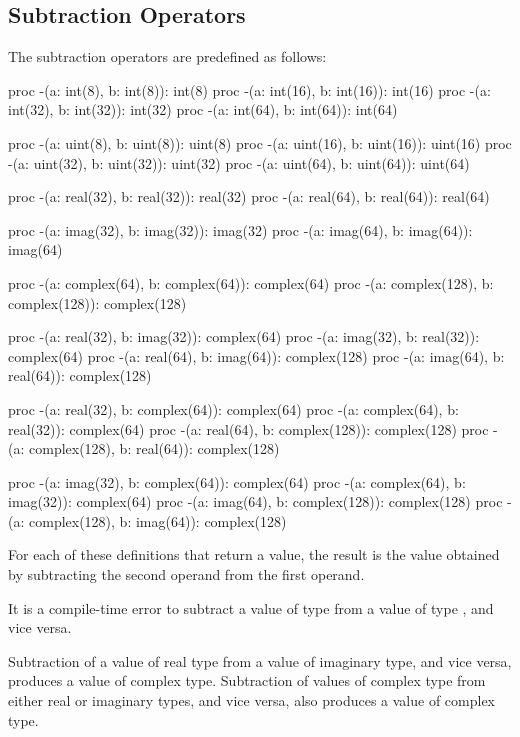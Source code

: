 \subsection{Subtraction Operators}
\label{Subtraction_Operators}

The subtraction operators are predefined as follows:
\begin{chapel}
proc -(a: int(8), b: int(8)): int(8)
proc -(a: int(16), b: int(16)): int(16)
proc -(a: int(32), b: int(32)): int(32)
proc -(a: int(64), b: int(64)): int(64)

proc -(a: uint(8), b: uint(8)): uint(8)
proc -(a: uint(16), b: uint(16)): uint(16)
proc -(a: uint(32), b: uint(32)): uint(32)
proc -(a: uint(64), b: uint(64)): uint(64)

proc -(a: real(32), b: real(32)): real(32)
proc -(a: real(64), b: real(64)): real(64)

proc -(a: imag(32), b: imag(32)): imag(32)
proc -(a: imag(64), b: imag(64)): imag(64)

proc -(a: complex(64), b: complex(64)): complex(64)
proc -(a: complex(128), b: complex(128)): complex(128)

proc -(a: real(32), b: imag(32)): complex(64)
proc -(a: imag(32), b: real(32)): complex(64)
proc -(a: real(64), b: imag(64)): complex(128)
proc -(a: imag(64), b: real(64)): complex(128)

proc -(a: real(32), b: complex(64)): complex(64)
proc -(a: complex(64), b: real(32)): complex(64)
proc -(a: real(64), b: complex(128)): complex(128)
proc -(a: complex(128), b: real(64)): complex(128)

proc -(a: imag(32), b: complex(64)): complex(64)
proc -(a: complex(64), b: imag(32)): complex(64)
proc -(a: imag(64), b: complex(128)): complex(128)
proc -(a: complex(128), b: imag(64)): complex(128)
\end{chapel}
For each of these definitions that return a value, the result is the
value obtained by subtracting the second operand from the first
operand.

It is a compile-time error to subtract a value of type 
from a value of type , and vice versa.

Subtraction of a value of real type from a value of imaginary type,
and vice versa, produces a value of complex type.  Subtraction of
values of complex type from either real or imaginary types, and vice
versa, also produces a value of complex type.

